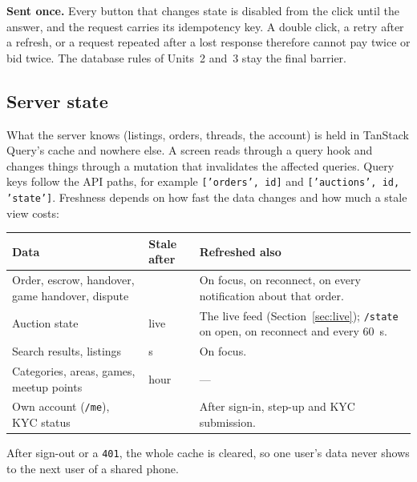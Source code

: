 \documentclass[11pt,a4paper]{article}
\newenvironment{dtable}[1]{\small\begin{longtable}{#1}}{\end{longtable}}
\begin{document}
\textbf{Sent once.} Every button that changes state is disabled from the click until the answer, and the request carries its idempotency key. A double click, a retry after a refresh, or a request repeated after a lost response therefore cannot pay twice or bid twice. The database rules of Units~2 and~3 stay the final barrier.

\subsection{Server state}
\label{sec:cache}
What the server knows (listings, orders, threads, the account) is held in TanStack Query's cache and nowhere else. A screen reads through a query hook and changes things through a mutation that invalidates the affected queries. Query keys follow the API paths, for example \texttt{['orders', id]} and \texttt{['auctions', id, 'state']}. Freshness depends on how fast the data changes and how much a stale view costs:
\begin{dtable}{@{}>{\raggedright\arraybackslash}p{5.2cm}>{\raggedright\arraybackslash}p{2.6cm}>{\raggedright\arraybackslash}p{7.4cm}@{}}
\toprule
\textbf{Data} & \textbf{Stale after} & \textbf{Refreshed also} \\ \midrule \endhead
Order, escrow, handover, game handover, dispute & 0 & On focus, on reconnect, on every notification about that order. \\
Auction state & live & The live feed (Section~\ref{sec:live}); \texttt{/state} on open, on reconnect and every 60~s. \\
Search results, listings & 30 s & On focus. \\
Categories, areas, games, meetup points & 1 hour & --- \\
Own account (\texttt{/me}), KYC status & 0 & After sign-in, step-up and KYC submission. \\
\bottomrule
\end{dtable}
After sign-out or a \texttt{401}, the whole cache is cleared, so one user's data never shows to the next user of a shared phone.
\end{document}
